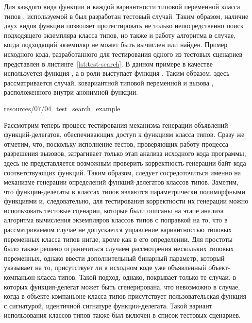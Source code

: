 Для каждого вида функции  и каждой вариантности типовой переменной класса типов , используемой в  был разработан тестовый случай. Таким образом, наличие двух видов функции  позволяет протестировать не только непосредственно поиск подходящего экземпляра класса типов, но также и работу алгоритма в случае, когда подходящий экземпляр не может быть вычислен или найден. Пример исходного кода, разработанного для тестирования одного из тестовых сценариев представлен в листинге~\ref{lst:test-search}. В данном примере в качестве  используется функция , а в роли  выступает функция . Таким образом, здесь рассматривается случай, ковариантной типовой переменной и вызова , расположенного внутри анонимной функции.  


{resources/07/04_test_search_example}  

Рассмотрим теперь процесс тестирования механизма генерации объявлений функций-делегатов, обеспечивающих доступ к функциям класса типов. Сразу же отметим, что, поскольку исполнение тестов, проверяющих работу процесса разрешения вызовов, затрагивает только этап анализа исходного кода программы, здесь не представляется возможным проверить корректность генерации байт-кода соответствующих функций. Таким образом, следует сосредоточиться именно на механизме генерации определений функций-делегатов классов типов. Заметим, что функции-делегаты в классах типов являются параметрически полиморфными функциями и, следовательно, для тестирования корректности их генерации можно использовать тестовые сценарии, которые были описаны на этапе анализа алгоритма вычисления экземпляров классов типов с поправкой на то, что в рассматриваемом случае не допускается управление вариантностью типовых переменных класса типов нигде, кроме как в его определении. Для простоты было также решено ограничиться случаем рассмотрения нескольких типовых переменных, однако ввести дополнительный бинарный параметр, который указывает на то, присутствует ли в исходном коде уже объявленный объект-компаньон класса типов. Такой подход, однако, покрывает только те случаи, в которых функция-делегат может быть сгенерирована, что невозможно в случае, когда в объекте-компаньоне класса типов присутствует пользовательская функция с сигнатурой, идентичной сигнатуре функции-делегата. Такой вариант использования классов типов также был включен в список тестовых сценариев. 

